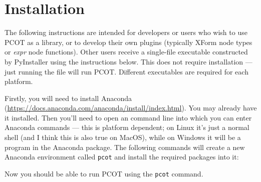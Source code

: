 

\clearpage
\section{Installation}
\label{inst:conda}
The following instructions are intended for developers or users who
wish to use PCOT as a library, or to develop their own plugins (typically
XForm node types or \emph{expr} node functions).
Other users receive a single-file executable constructed by PyInstaller
using the instructions below. This does not require installation --- just
running the file will run PCOT. Different executables are required for
each platform.

Firstly, you will need to install Anaconda (\url{https://docs.anaconda.com/anaconda/install/index.html}). You may already have it
installed. Then you'll need to open an command line into which you can enter Anaconda commands --- this is platform dependent; on
Linux it's just a normal shell (and I think this is also true on MacOS), while on Windows it will be a program in the Anaconda package.
The following commands will 
create a new Anaconda environment called \texttt{pcot} and install the required packages into it:
\vspace{1em}
\begin{paracol}{2}
\end{paracol}
\vspace{1em}
\noindent Now you should be able to run PCOT using the \texttt{pcot} command.


